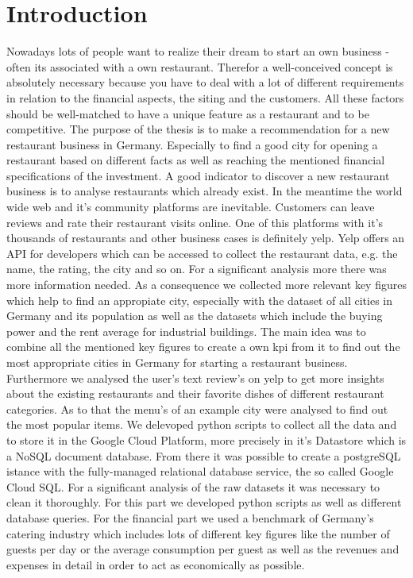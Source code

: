 \section{Introduction}
\label{sec:introduction}
Nowadays lots of people want to realize their dream to start an own business - often its associated with a own restaurant. Therefor a well-conceived concept is absolutely necessary because you have to deal with a lot of different requirements in relation to the financial aspects, the siting and the customers. All these factors should be well-matched to have a unique feature as a restaurant and to be competitive. \newline
The purpose of the thesis is to make a recommendation for a new restaurant business in Germany. Especially to find a good city for opening a restaurant based on different facts as well as reaching the mentioned financial specifications of the investment.
A good indicator to discover a new restaurant business is to analyse restaurants which already exist. In the meantime the world wide web and it's community platforms are inevitable. Customers can leave reviews and rate their restaurant visits online. One of this platforms with it's thousands of restaurants and other business cases is definitely yelp. Yelp offers an API for developers which can be accessed to collect the restaurant data, e.g. the name, the rating, the city and so on. For a significant analysis more there was more information needed. As a consequence we collected more relevant key figures which help to find an appropiate city, especially with the dataset of all cities in Germany and its population as well as the datasets which include the buying power and the rent average for industrial buildings. The main idea was to combine all the mentioned key figures to create a own kpi from it to find out the most appropriate cities  in Germany for starting a restaurant business. Furthermore we analysed the user's text review's on yelp to get more insights about the existing restaurants and their favorite dishes of different restaurant categories. As to that the menu's of an example city were analysed to find out the most popular items. We delevoped python scripts to collect all the data and to store it in the Google Cloud Platform, more precisely in it's Datastore which is a NoSQL document database. From there it was possible to create a postgreSQL istance with the fully-managed relational database service, the so called Google Cloud SQL. For a significant analysis of the raw datasets it was necessary to clean it thoroughly. For this part we developed python scripts as well as different database queries. \newline For the financial part we used a benchmark of Germany's catering industry which includes lots of different key figures like the number of guests per day or the average consumption per guest as well as the revenues and expenses in detail in order to act as economically as possible.